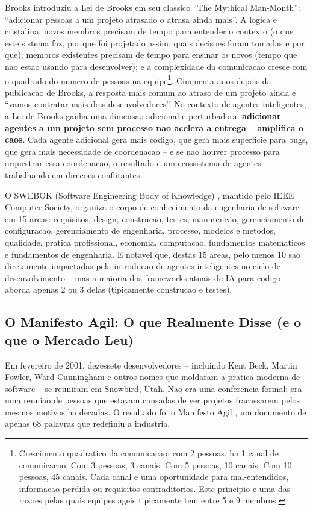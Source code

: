 \documentclass[12pt,a4paper,oneside,sumario=tradicional,chapter=TITLE,section=TITLE,subsection=TITLE,english,brazil]{abntex2}
\begin{document}
Brooks \cite{brooks1975mythical} introduziu a Lei de Brooks em seu classico ``The Mythical Man-Month'': ``adicionar pessoas a um projeto atrasado o atrasa ainda mais''. A logica e cristalina: novos membros precisam de tempo para entender o contexto (o que este sistema faz, por que foi projetado assim, quais decisoes foram tomadas e por que); membros existentes precisam de tempo para ensinar os novos (tempo que nao estao usando para desenvolver); e a complexidade da comunicacao cresce com o quadrado do numero de pessoas na equipe\footnote{Crescimento quadratico da comunicacao: com 2 pessoas, ha 1 canal de comunicacao. Com 3 pessoas, 3 canais. Com 5 pessoas, 10 canais. Com 10 pessoas, 45 canais. Cada canal e uma oportunidade para mal-entendidos, informacao perdida ou requisitos contraditorios. Este principio e uma das razoes pelas quais equipes ageis tipicamente tem entre 5 e 9 membros.}. Cinquenta anos depois da publicacao de Brooks, a resposta mais comum ao atraso de um projeto ainda e ``vamos contratar mais dois desenvolvedores''. No contexto de agentes inteligentes, a Lei de Brooks ganha uma dimensao adicional e perturbadora: \textbf{adicionar agentes a um projeto sem processo nao acelera a entrega -- amplifica o caos}. Cada agente adicional gera mais codigo, que gera mais superficie para bugs, que gera mais necessidade de coordenacao -- e se nao houver processo para orquestrar essa coordenacao, o resultado e um ecossistema de agentes trabalhando em direcoes conflitantes.

O SWEBOK (Software Engineering Body of Knowledge) \cite{swebok2014}, mantido pelo IEEE Computer Society, organiza o corpo de conhecimento da engenharia de software em 15 areas: requisitos, design, construcao, testes, manutencao, gerenciamento de configuracao, gerenciamento de engenharia, processo, modelos e metodos, qualidade, pratica profissional, economia, computacao, fundamentos matematicos e fundamentos de engenharia. E notavel que, destas 15 areas, pelo menos 10 sao diretamente impactadas pela introducao de agentes inteligentes no ciclo de desenvolvimento -- mas a maioria dos frameworks atuais de IA para codigo aborda apenas 2 ou 3 delas (tipicamente construcao e testes).

\subsection{O Manifesto Agil: O que Realmente Disse (e o que o Mercado Leu)}

Em fevereiro de 2001, dezessete desenvolvedores -- incluindo Kent Beck, Martin Fowler, Ward Cunningham e outros nomes que moldaram a pratica moderna de software -- se reuniram em Snowbird, Utah. Nao era uma conferencia formal; era uma reuniao de pessoas que estavam cansadas de ver projetos fracassarem pelos mesmos motivos ha decadas. O resultado foi o Manifesto Agil \cite{beck2001manifesto}, um documento de apenas 68 palavras que redefiniu a industria.
\end{document}
